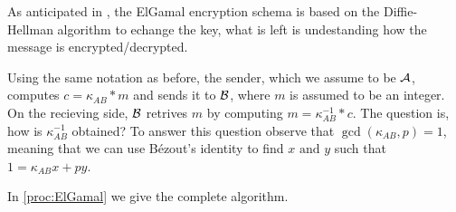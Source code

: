 \documentclass{subfiles}
\begin{document}
   
    As anticipated in ,
        the ElGamal encryption schema is based on the Diffie-Hellman algorithm to echange the key,
        what is left is undestanding how the message is encrypted/decrypted.

    Using the same notation as before, the sender, which we assume to be \(\operatorname{\mathcal{A}}\),
        computes \(c = \kappa_{AB} * m\) and sends it to \(\operatorname{\mathcal{B}}\),
        where \(m\) is assumed to be an integer.
        On the recieving side, \(\operatorname{\mathcal{B}}\) retrives \(m\) by computing \(m = \kappa_{AB}^{-1} * c\).
        The question is, how is \(\kappa_{AB}^{-1}\) obtained? 
        To answer this question observe that \(\gcd(\kappa_{AB}, p) = 1\),
        meaning that we can use Bézout's identity to find \(x \text{ and } y\) such that \(1 = \kappa_{AB}x + py\).

    In \autoref{proc:ElGamal} we give the complete algorithm.
        
\end{document}
